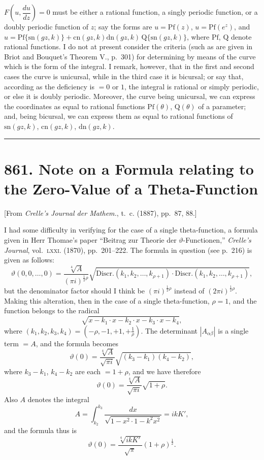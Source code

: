 \documentclass[11pt,a4paper]{book}
\providecommand{\Pf}{\mathrm{Pf}}
\providecommand{\sn}{\mathrm{sn}}
\providecommand{\cn}{\mathrm{cn}}
\providecommand{\dn}{\mathrm{dn}}
\begin{document}
$F\!\left(u, \dfrac{du}{dz}\right) = 0$ must be either a rational function, a singly periodic function, or a doubly periodic function of $z$; say the forms are $u = \Pf(z)$, $u = \Pf(e^z)$, and $u = \Pf\{\sn(gz, k)\} + \cn(gz, k)\dn(gz, k)\, \mathrm{Q}\{\sn(gz, k)\}$, where $\Pf$, $\mathrm{Q}$ denote rational functions. I do not at present consider the criteria (such as are given in Briot and Bouquet's Theorem V., p.~301) for determining by means of the curve which is the form of the integral. I remark, however, that in the first and second cases the curve is unicursal, while in the third case it is bicursal; or say that, according as the deficiency is $= 0$ or $1$, the integral is rational or simply periodic, or else it is doubly periodic. Moreover, the curve being unicursal, we can express the coordinates as equal to rational functions $\Pf(\theta)$, $\mathrm{Q}(\theta)$ of a parameter; and, being bicursal, we can express them as equal to rational functions of $\sn(gz, k)$, $\cn(gz, k)$, $\dn(gz, k)$.

\vspace{12pt}
\hrule
\vspace{12pt}

\section*{861. Note on a Formula relating to the Zero-Value of a Theta-Function}

\begin{center}
[From \textit{Crelle's Journal der Mathem.}, t.~c. (1887), pp.~87, 88.]
\end{center}

I had some difficulty in verifying for the case of a single theta-function, a formula given in Herr Thomae's paper ``Beitrag zur Theorie der $\vartheta$-Functionen,'' \textit{Crelle's Journal}, vol.~\textsc{lxxi}. (1870), pp.~201--222. The formula in question (see p.~216) is given as follows:
\[
\vartheta(0, 0, \ldots, 0) = \frac{\sqrt[4]{A}}{(\pi i)^{\frac{1}{2}\rho}} \sqrt{\text{Discr.}(k_1, k_2, \ldots, k_{\rho+1}) \cdot \text{Discr.}(k_1, k_2, \ldots, k_{\rho+1})},
\]
but the denominator factor should I think be $(\pi i)^{\frac{1}{2}\rho}$ instead of $(2\pi i)^{\frac{1}{2}\rho}$. Making this alteration, then in the case of a single theta-function, $\rho = 1$, and the function belongs to the radical
\[
\sqrt{x - k_1 \cdot x - k_2 \cdot x - k_3 \cdot x - k_4},
\]
where $(k_1, k_2, k_3, k_4) = (-\rho, -1, +1, +\frac{1}{\rho})$. The determinant $|A_{\alpha\beta}|$ is a single term $= A$, and the formula becomes
\[
\vartheta(0) = \frac{\sqrt[4]{A}}{\sqrt{\pi i}} \sqrt{(k_3 - k_1)(k_4 - k_2)},
\]
where $k_3 - k_1$, $k_4 - k_2$ are each $= 1 + \rho$, and we have therefore
\[
\vartheta(0) = \frac{\sqrt[4]{A}}{\sqrt{\pi i}} \sqrt{1 + \rho}.
\]
Also $A$ denotes the integral
\[
A = \int_{k_2}^{k_3} \frac{dx}{\sqrt{1 - x^2 \cdot 1 - k^2 x^2}} = ikK',
\]
and the formula thus is
\[
\vartheta(0) = \frac{\sqrt[4]{ikK'}}{\sqrt{\pi}} (1 + \rho)^{\frac{1}{2}}.
\]
\end{document}
